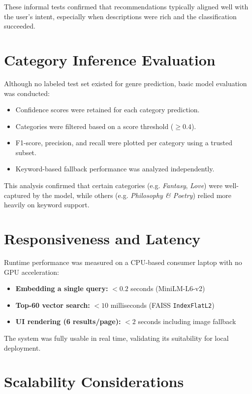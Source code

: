 These informal tests confirmed that recommendations typically aligned well with the user’s intent, especially when descriptions were rich and the classification succeeded.

\section{Category Inference Evaluation}
\label{sec:category-eval}

Although no labeled test set existed for genre prediction, basic model evaluation was conducted:

\begin{itemize}
    \item Confidence scores were retained for each category prediction.
    \item Categories were filtered based on a score threshold ($\geq 0.4$).
    \item F1-score, precision, and recall were plotted per category using a trusted subset.
    \item Keyword-based fallback performance was analyzed independently.
\end{itemize}

This analysis confirmed that certain categories (e.g. \textit{Fantasy}, \textit{Love}) were well-captured by the model, while others (e.g. \textit{Philosophy \& Poetry}) relied more heavily on keyword support.

\section{Responsiveness and Latency}
\label{sec:latency}

Runtime performance was measured on a CPU-based consumer laptop with no GPU acceleration:

\begin{itemize}
    \item \textbf{Embedding a single query:} $< 0.2$ seconds (MiniLM-L6-v2)
    \item \textbf{Top-60 vector search:} $< 10$ milliseconds (FAISS \texttt{IndexFlatL2})
    \item \textbf{UI rendering (6 results/page):} $< 2$ seconds including image fallback
\end{itemize}

The system was fully usable in real time, validating its suitability for local deployment.

\section{Scalability Considerations}
\label{sec:scaling}

